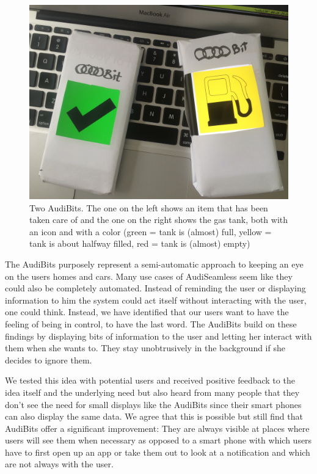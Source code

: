 \begin{figure}[ht]
\centering
	\includegraphics[keepaspectratio, width=\textwidth]{Figures/Specifications/AudiBits}
	\caption{Two AudiBits. The one on the left shows an item that has been taken care of and the one on the right shows the gas tank, both with an icon and with a color (green = tank is (almost) full, yellow = tank is about halfway filled, red = tank is (almost) empty)}
	\label{fig:AudiBits}
\end{figure}

The AudiBits purposely represent a semi-automatic approach to keeping an eye on the users homes and cars. Many use cases of AudiSeamless seem like they could also be completely automated. Instead of reminding the user or displaying information to him the system could act itself without interacting with the user, one could think. Instead, we have identified that our users want to have the feeling of being in control, to have the last word. The AudiBits build on these findings by displaying bits of information to the user and letting her interact with them when she wants to. They stay unobtrusively in the background if she decides to ignore them.

We tested this idea with potential users and received positive feedback to the idea itself and the underlying need but also heard from many people that they don't see the need for small displays like the AudiBits since their smart phones can also display the same data. We agree that this is possible but still find that AudiBits offer a significant improvement: They are always visible at places where users will see them when necessary as opposed to a smart phone with which users have to first open up an app or take them out to look at a notification and which are not always with the user.

